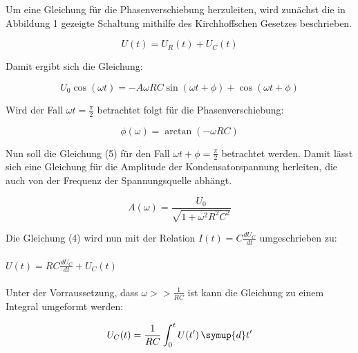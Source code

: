 Um eine Gleichung für die Phasenverschiebung herzuleiten, wird zunächst die in Abbildung 1
gezeigte Schaltung mithilfe des Kirchhoffschen Gesetzes beschrieben.

\begin{equation}
  U(t) = U_R(t) + U_C(t)
\end{equation}

Damit ergibt sich die Gleichung:

\begin{equation}
  U_0 \cos(\omega t) = -A\omega RC \sin(\omega t + \phi) + \cos(\omega t + \phi)
\end{equation}

Wird der Fall $\omega t = \frac{\pi}{2}$ betrachtet folgt für die Phasenverschiebung:

\begin{equation}
  \phi(\omega) = \arctan(-\omega RC)
\end{equation}

Nun soll die Gleichung (5) für den Fall $\omega t + \phi = \frac{\pi}{2}$ betrachtet werden.
Damit lässt sich eine Gleichung für die Amplitude der Kondensatorspannung herleiten, die
auch von der Frequenz der Spannungsquelle abhängt.

\begin{equation}
  A(\omega) = \frac{U_0}{\sqrt{1+\omega^2 R^2 C^2}}
\end{equation}

Die Gleichung (4) wird nun mit der Relation $I(t) = C\frac{dU_C}{dt}$ umgeschrieben zu:\\\\

$U(t) = RC \frac{dU_C}{dt} + U_C(t)$\\\\

Unter der Vorraussetzung, dass $\omega >> \frac{1}{RC}$ ist kann die Gleichung
zu einem Integral umgeformt werden:

\begin{equation}
  U_C(t) = \frac{1}{RC} \int_{0}^{t} U(t')  \, \symup{d}t'
\end{equation}
